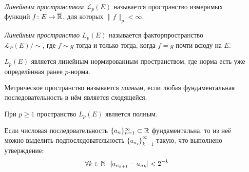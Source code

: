 \begin{definition}
	\textit{Линейным пространством $\mathcal{L}_p(E)$} называется пространство измеримых функций $f \colon E \to \overline{\mathbb{R}}$, для которых $\|f\|_p < \infty$.
\end{definition}

\begin{definition}
	\textit{Линейным пространство $L_p(E)$} называется факторпространство \\ $\mathcal{L}_P(E) / \sim$, где $f \sim g$ тогда и только тогда, когда $f = g$ почти всюду на $E$.
\end{definition}

\begin{corollary}
	$L_p(E)$ является линейным нормированным пространством, где норма есть уже определённая ранее $p$-норма.
\end{corollary}

\begin{reminder}
	Метрическое пространство называется \textit{полным}, если любая фундаментальная последовательность в нём является сходящейся.
\end{reminder}

\begin{theorem}
	При $p \ge 1$ пространство $L_p(E)$ является полным.
\end{theorem}

\begin{exercise}
	Если числовая последовательность $\{a_n\}_{n = 1}^\infty \subset \mathbb{R}$ фундаментальна, то из неё можно выделить подпоследовательность $\{a_{n_k}\}_{k = 1}^\infty$ такую, что выполнено утверждение:
	\[
		\forall k \in \mathbb{N}\ \ |a_{n_{k + 1}} - a_{n_k}| < 2^{-k}
	\] 
\end{exercise}

